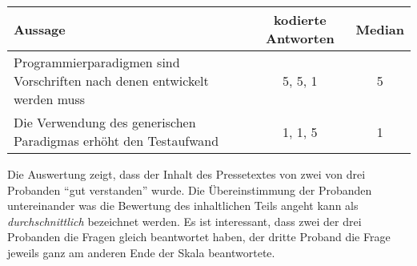 \begin{table}[!ht]
    \begin{center}
        \begin{tabular}{p{8cm}cc}
        \toprule
        \textbf{Aussage} & \textbf{kodierte Antworten} & \textbf{Median} \\
        \midrule
       Programmierparadigmen sind Vorschriften nach denen entwickelt werden muss & 5, 5, 1 & 5\\
        \addlinespace
        Die Verwendung des generischen Paradigmas erhöht den Testaufwand & 1, 1, 5 & 1 \\
        \bottomrule
        \end{tabular}
    \end{center}
\end{table}

Die Auswertung zeigt, dass der Inhalt des Pressetextes von zwei von drei Probanden
\enquote{gut verstanden} wurde. Die Übereinstimmung der Probanden
untereinander was die Bewertung des inhaltlichen Teils angeht kann als
\emph{durchschnittlich} bezeichnet werden. Es ist interessant, dass zwei der 
drei Probanden die Fragen gleich beantwortet haben, der dritte Proband die Frage jeweils
ganz am anderen Ende der Skala beantwortete.








